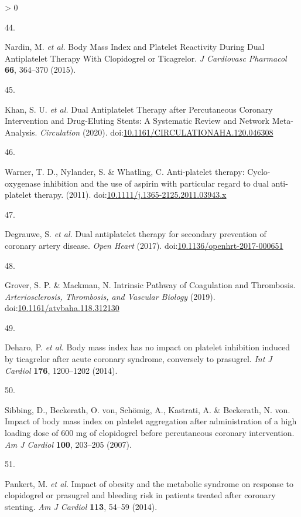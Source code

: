 \documentclass[11pt,twoside]{bristolthesis}
\newlength{\cslhangindent}
\newlength{\csllabelwidth}
\newenvironment{CSLReferences}[2] %
 {%
  \setlength{\parindent}{0pt}
  \ifodd #1 \everypar{\setlength{\hangindent}{\cslhangindent}}\ignorespaces\fi
  \ifnum #2 > 0
  \setlength{\parskip}{#2\baselineskip}
  \fi
 }%
 {}
\newcommand{\CSLLeftMargin}[1]{\parbox[t]{\csllabelwidth}{#1}}
\newcommand{\CSLRightInline}[1]{\parbox[t]{\linewidth - \csllabelwidth}{#1}\break}
\begin{document}
\begin{CSLReferences}{0}{0}
\leavevmode\hypertarget{ref-Nardin2015}{}%
\CSLLeftMargin{44. }
\CSLRightInline{Nardin, M. \emph{et al.} {Body Mass Index and Platelet Reactivity During Dual Antiplatelet Therapy With Clopidogrel or Ticagrelor}. \emph{J Cardiovasc Pharmacol} \textbf{66}, 364--370 (2015).}

\leavevmode\hypertarget{ref-Khan2020}{}%
\CSLLeftMargin{45. }
\CSLRightInline{Khan, S. U. \emph{et al.} {Dual Antiplatelet Therapy after Percutaneous Coronary Intervention and Drug-Eluting Stents: A Systematic Review and Network Meta-Analysis}. \emph{Circulation} (2020). doi:\href{https://doi.org/10.1161/CIRCULATIONAHA.120.046308}{10.1161/CIRCULATIONAHA.120.046308}}

\leavevmode\hypertarget{ref-Warner2011}{}%
\CSLLeftMargin{46. }
\CSLRightInline{Warner, T. D., Nylander, S. \& Whatling, C. {Anti-platelet therapy: Cyclo-oxygenase inhibition and the use of aspirin with particular regard to dual anti-platelet therapy}. (2011). doi:\href{https://doi.org/10.1111/j.1365-2125.2011.03943.x}{10.1111/j.1365-2125.2011.03943.x}}

\leavevmode\hypertarget{ref-Degrauwe2017}{}%
\CSLLeftMargin{47. }
\CSLRightInline{Degrauwe, S. \emph{et al.} {Dual antiplatelet therapy for secondary prevention of coronary artery disease}. \emph{Open Heart} (2017). doi:\href{https://doi.org/10.1136/openhrt-2017-000651}{10.1136/openhrt-2017-000651}}

\leavevmode\hypertarget{ref-Grover2019}{}%
\CSLLeftMargin{48. }
\CSLRightInline{Grover, S. P. \& Mackman, N. {Intrinsic Pathway of Coagulation and Thrombosis}. \emph{Arteriosclerosis, Thrombosis, and Vascular Biology} (2019). doi:\href{https://doi.org/10.1161/atvbaha.118.312130}{10.1161/atvbaha.118.312130}}

\leavevmode\hypertarget{ref-Deharo2014}{}%
\CSLLeftMargin{49. }
\CSLRightInline{Deharo, P. \emph{et al.} {Body mass index has no impact on platelet inhibition induced by ticagrelor after acute coronary syndrome, conversely to prasugrel}. \emph{Int J Cardiol} \textbf{176}, 1200--1202 (2014).}

\leavevmode\hypertarget{ref-Sibbing2007}{}%
\CSLLeftMargin{50. }
\CSLRightInline{Sibbing, D., Beckerath, O. von, Schömig, A., Kastrati, A. \& Beckerath, N. von. {Impact of body mass index on platelet aggregation after administration of a high loading dose of 600 mg of clopidogrel before percutaneous coronary intervention}. \emph{Am J Cardiol} \textbf{100}, 203--205 (2007).}

\leavevmode\hypertarget{ref-Pankert2014}{}%
\CSLLeftMargin{51. }
\CSLRightInline{Pankert, M. \emph{et al.} {Impact of obesity and the metabolic syndrome on response to clopidogrel or prasugrel and bleeding risk in patients treated after coronary stenting}. \emph{Am J Cardiol} \textbf{113}, 54--59 (2014).}


\end{CSLReferences}
\end{document}
